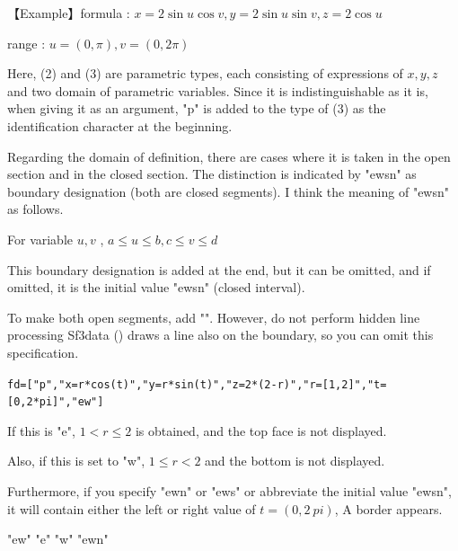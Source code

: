 \documentclass[papersize,a4paper,12pt]{article}
\begin{document}
\hspace{5mm} 【Example】formula : $x=2\sin u \cos v , y=2\sin u \sin v  , z=2\cos u $ 

\hspace{15mm} range : $u=(0,\pi) , v=(0,2\pi)$

\vspace{\baselineskip}

Here, (2) and (3) are parametric types, each consisting of expressions of $ x, y, z $ and two domain of parametric variables. Since it is indistinguishable as it is, when giving it as an argument, "p" is added to the type of (3) as the identification character at the beginning.

Regarding the domain of definition, there are cases where it is taken in the open section and in the closed section. The distinction is indicated by "ewsn" as boundary designation (both are closed segments). I think the meaning of "ewsn" as follows.

\vspace{\baselineskip}
For variable $u,v$ , $a \leq u \leq b,c \leq v \leq d$

 \begin{center}  \end{center}

This boundary designation is added at the end, but it can be omitted, and if omitted, it is the initial value "ewsn" (closed interval).

To make both open segments, add "". However, do not perform hidden line processing
Sf3data () draws a line also on the boundary, so you can omit this specification.

\vspace{\baselineskip}
\verb|fd=["p","x=r*cos(t)","y=r*sin(t)","z=2*(2-r)","r=[1,2]","t=[0,2*pi]","ew"]|

\vspace{\baselineskip}
If this is "e", $ 1 <r \leq 2 $ is obtained, and the top face is not displayed.

Also, if this is set to "w", $ 1 \leq r <2 $ and the bottom is not displayed.

Furthermore, if you specify "ewn" or "ews" or abbreviate the initial value "ewsn", it will contain either the left or right value of $ t = (0, 2 \ pi) $, A border appears.

\vspace{\baselineskip}
\hspace{12mm}"ew" \hspace{25mm}"e" \hspace{25mm}"w" \hspace{25mm}"ewn"
\end{document}
